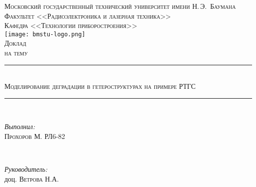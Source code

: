 \newcommand{\HRule}{\rule{\linewidth}{.5mm}\\}

\begin{center}

\textsc{\large Московский государственный технический университет имени Н.\,Э.~Баумана}\\[5mm]
\textsc{Факультет <<Радиоэлектроника и лазерная техника>>}\\
\textsc{Кафедра <<Технологии приборостроения>>}\\[2.5mm]

\texttt{[image: bmstu-logo.png]}\\[0.5cm]

\textsc{\large Доклад}\\
\textsc{на тему}

\HRule[0.5cm]
{\huge \textsc{Моделирование деградации в гетероструктурах на примере РТГС}}
\HRule[3cm]


        \begin{minipage}{0.4\textwidth}
            \begin{flushleft} \large
                \emph{Выполнил:}\\
                \textsc{Прохоров} М. РЛ6-82
            \end{flushleft}
        \end{minipage}
        ~
        \begin{minipage}{0.4\textwidth}
            \begin{flushright} \large
                \emph{Руководитель:} \\
                доц. \textsc{Ветрова} Н.А.
            \end{flushright}
        \end{minipage}\\[1cm]


\vfill




\end{center}

\newpage
{}


